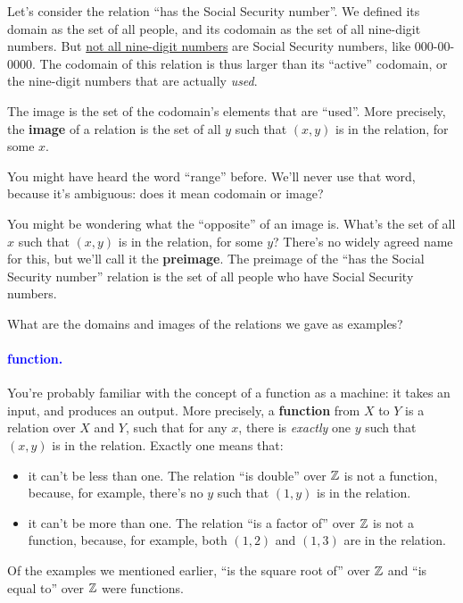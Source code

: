 \documentclass[11pt,paper=letter]{scrartcl}
\renewcommand{\bluebf}[1]{{\bfseries \color{Blue} #1}}
\renewcommand\wp[1]{\paragraph{\textcolor{Blue}{#1.}} \hspace{-1em}}
\newcommand\wl[1]{\label{w:#1}}
\begin{document}
Let's consider the relation ``has the Social Security number''. We defined its domain as the set of all people, and its codomain as the set of all nine-digit numbers. But \href{https://en.wikipedia.org/wiki/Social_Security_number#Valid_SSNs}{not all nine-digit numbers} are Social Security numbers, like 000-00-0000. The codomain of this relation is thus larger than its ``active'' codomain, or the nine-digit numbers that are actually \textit{used}.

The image is the set of the codomain's elements that are ``used''. More precisely, the \bluebf{image} of a relation is the set of all $y$ such that $(x, y)$ is in the relation, for some $x$.

\begin{remboxed}
  You might have heard the word ``range'' before. We'll never use that word, because it's ambiguous: does it mean codomain or image?
\end{remboxed}

You might be wondering what the ``opposite'' of an image is. What's the set of all $x$ such that $(x, y)$ is in the relation, for some $y$? There's no widely agreed name for this, but we'll call it the \textbf{preimage}. The preimage of the ``has the Social Security number'' relation is the set of all people who have Social Security numbers.

\begin{exrboxed}
  What are the domains and images of the relations we gave as examples?
\end{exrboxed}

\wp{function}
\wl{function}
You're probably familiar with the concept of a function as a machine: it takes an input, and produces an output. More precisely, a \bluebf{function} from $X$ to $Y$ is a relation over $X$ and $Y$, such that for any $x$, there is \textit{exactly} one $y$ such that $(x, y)$ is in the relation. Exactly one means that:

\begin{itemize}
  \item it can't be less than one. The relation ``is double'' over $\mathbb Z$ is not a function, because, for example, there's no $y$ such that $(1, y)$ is in the relation.
  \item it can't be more than one. The relation ``is a factor of'' over $\mathbb Z$ is not a function, because, for example, both $(1, 2)$ and $(1, 3)$ are in the relation.
\end{itemize}

Of the examples we mentioned earlier, ``is the square root of'' over $\mathbb Z$ and ``is equal to'' over $\mathbb Z$ were functions.
\end{document}
